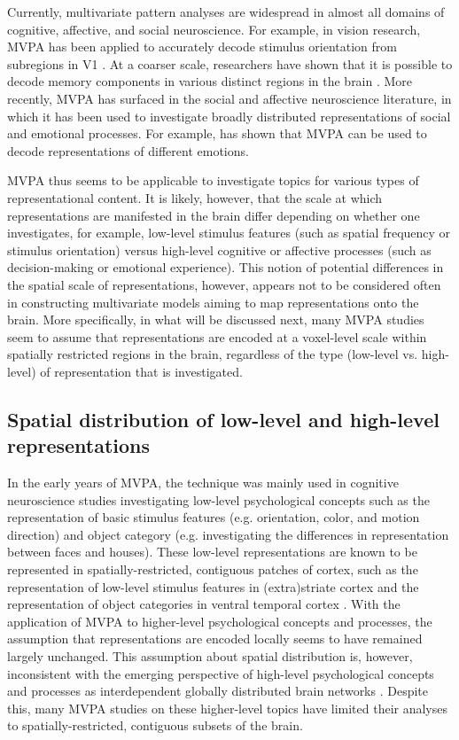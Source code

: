 \documentclass[jou,12pt,a4paper]{apa6}
\begin{document}
Currently, multivariate pattern analyses are widespread in almost all domains of cognitive, affective, and social neuroscience. For example, in vision research, MVPA has been applied to accurately decode stimulus orientation from subregions in V1 \cite{kamitani2005}. At a coarser scale, researchers have shown that it is possible to decode memory components in various distinct regions in the brain \cite{chadwick2010,visser2013}. More recently, MVPA has surfaced in the social and affective neuroscience literature, in which it has been used to investigate broadly distributed representations of social and emotional processes. For example,  has shown that MVPA can be used to decode representations of different emotions. 

MVPA thus seems to be applicable to investigate topics for various types of representational content. It is likely, however, that the scale at which representations are manifested in the brain differ depending on whether one investigates, for example, low-level stimulus features (such as spatial frequency or stimulus orientation) versus high-level cognitive or affective processes (such as decision-making or emotional experience). This notion of potential differences in the spatial scale of representations, however, appears not to be considered often in constructing multivariate models aiming to map representations onto the brain. More specifically, in what will be discussed next, many MVPA studies seem to assume that representations are encoded at a voxel-level scale within spatially restricted regions in the brain, regardless of the type (low-level vs. high-level) of representation that is investigated.    

\subsection{Spatial distribution of low-level and high-level representations}
\noindent In the early years of MVPA, the technique was mainly used in cognitive neuroscience studies investigating low-level psychological concepts such as the representation of basic stimulus features (e.g. orientation, color, and motion direction) and object category (e.g. investigating the differences in representation between faces and houses). These low-level representations are known to be represented in spatially-restricted, contiguous patches of cortex, such as the representation of low-level stimulus features in (extra)striate cortex \cite{kamitani2005,parkes2009} and the representation of object categories in ventral temporal cortex \cite{haxby2001,eger2008,rice2014}. With the application of MVPA to higher-level psychological concepts and processes, the assumption that representations are encoded locally seems to have remained largely unchanged. This assumption about spatial distribution is, however, inconsistent with the emerging perspective of high-level psychological concepts and processes as interdependent globally distributed brain networks \cite{bressler2010,barrett2013,bullmore2009}. Despite this, many MVPA studies on these higher-level topics have limited their analyses to spatially-restricted, contiguous subsets of the brain. 
\end{document}
